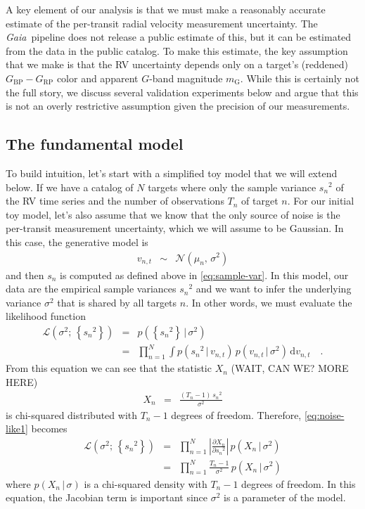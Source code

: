 \documentclass[modern, letterpaper]{aastex631}
\newcommand{\project}[1]{\textsl{#1}}
\newcommand{\Gaia}{\project{Gaia}}
\newcommand{\dd}{\ensuremath{\,\mathrm{d}}}
\begin{document}
A key element of our analysis is that we must make a reasonably accurate estimate of the per-transit radial velocity measurement uncertainty.
The \Gaia\ pipeline does not release a public estimate of this, but it can be estimated from the data in the public catalog.
To make this estimate, the key assumption that we make is that the RV uncertainty depends only on a target's (reddened) $G_\mathrm{BP} - G_\mathrm{RP}$ color and apparent $G$-band magnitude $m_\mathrm{G}$.
While this is certainly not the full story, we discuss several validation experiments below and argue that this is not an overly restrictive assumption given the precision of our measurements.

\subsection{The fundamental model}

To build intuition, let's start with a simplified toy model that we will extend below.
If we have a catalog of $N$ targets where only the sample variance ${s_n}^2$ of the RV time series and the number of observations $T_n$ of target $n$.
For our initial toy model, let's also assume that we know that the only source of noise is the per-transit measurement uncertainty, which we will assume to be Gaussian.
In this case, the generative model is
\begin{eqnarray}
	v_{n,t} &\sim& \mathcal{N}(\mu_n,\,\sigma^2)
\end{eqnarray}
and then $s_n$ is computed as defined above in \autoref{eq:sample-var}.
In this model, our data are the empirical sample variances ${s_n}^2$ and we want to infer the underlying variance $\sigma^2$ that is shared by all targets $n$.
In other words, we must evaluate the likelihood function
\begin{eqnarray}
	\label{eq:noise-like1}
	\mathcal{L}(\sigma^2;\,\left\{{s_n}^2\right\}) &=& p(\left\{{s_n}^2\right\}\,|\,\sigma^2) \\
	&=& \prod_{n=1}^N\int p({s_n}^2\,|\,v_{n,t})\,p(v_{n,t}\,|\,\sigma^2) \dd v_{n,t}\quad.
\end{eqnarray}
From this equation we can see that the statistic $X_n$ (WAIT, CAN WE? MORE HERE)
\begin{eqnarray}
	X_n &=& \frac{(T_n - 1)\,{s_n}^2}{\sigma^2}
\end{eqnarray}
is chi-squared distributed with $T_n - 1$ degrees of freedom.
Therefore, \autoref{eq:noise-like1} becomes
\begin{eqnarray}
	\label{eq:noise-like2}
	\mathcal{L}(\sigma^2;\,\left\{{s_n}^2\right\}) &=& \prod_{n=1}^N \left|\frac{\partial X_n}{\partial {s_n}^2}\right|\,p(X_n\,|\,\sigma^2) \nonumber\\
	&=& \prod_{n=1}^N \frac{T_n - 1}{\sigma^2}\,p(X_n\,|\,\sigma^2)
\end{eqnarray}
where $p(X_n\,|\,\sigma)$ is a chi-squared density with $T_n - 1$ degrees of freedom.
In this equation, the Jacobian term is important since $\sigma^2$ is a parameter of the model.
\end{document}
